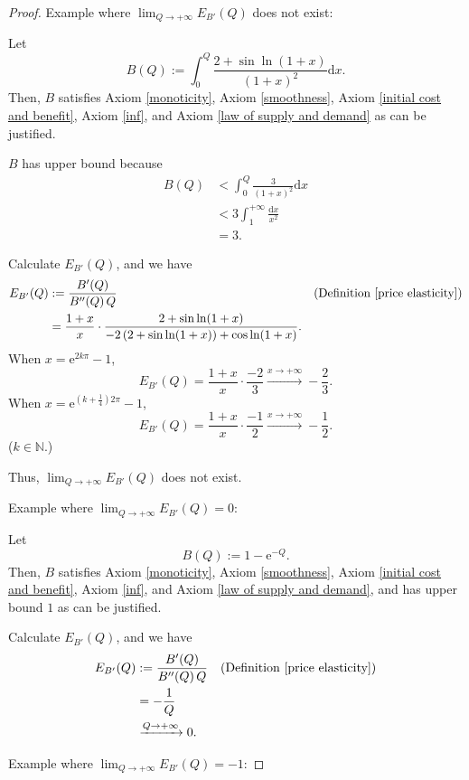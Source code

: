 \documentclass{article}
\begin{document}
\begin{proof}
Example where $\lim_{Q\to+\infty}E_{B'}\!\left(Q\right)$ does not exist:

Let
$$B\!\left(Q\right):=\int_0^Q\frac{2+\sin\ln\!\left(1+x\right)}{\left(1+x\right)^2}\mathrm dx.$$
Then, $B$ satisfies Axiom \ref{monoticity}, Axiom \ref{smoothness}, Axiom \ref{initial cost and benefit}, Axiom \ref{inf}, and Axiom \ref{law of supply and demand} as can be justified.

$B$ has upper bound because
\begin{align*}
B\!\left(Q\right)&<\int_0^Q\frac3{\left(1+x\right)^2}\mathrm dx\\
&<3\int_1^{+\infty}\frac{\mathrm dx}{x^2}\\
&=3.
\end{align*}

Calculate $E_{B'}\!\left(Q\right)$, and we have
\begin{align*}
E_{B'}\!\left(Q\right)&:=\frac{B'\!\left(Q\right)}{B''\!\left(Q\right)Q}&&\text{(Definition \ref{price elasticity})}\\
&=\frac{1+x}x\cdot\frac{2+\sin\ln\!\left(1+x\right)}{-2\left(2+\sin\ln\!\left(1+x\right)\right)+\cos\ln\!\left(1+x\right)}.
\end{align*}
When $x=\mathrm e^{2k\pi}-1$,
$$E_{B'}\!\left(Q\right)=\frac{1+x}x\cdot\frac{-2}3\xrightarrow{x\to+\infty}-\frac23.$$
When $x=\mathrm e^{\left(k+\frac14\right)2\pi}-1$,
$$E_{B'}\!\left(Q\right)=\frac{1+x}x\cdot\frac{-1}2\xrightarrow{x\to+\infty}-\frac12.$$
($k\in\mathbb N$.)

Thus, $\lim_{Q\to+\infty}E_{B'}\!\left(Q\right)$ does not exist.

Example where $\lim_{Q\to+\infty}E_{B'}\!\left(Q\right)=0$:

Let
$$B\!\left(Q\right):=1-\mathrm e^{-Q}.$$
Then, $B$ satisfies Axiom \ref{monoticity}, Axiom \ref{smoothness}, Axiom \ref{initial cost and benefit}, Axiom \ref{inf}, and Axiom \ref{law of supply and demand}, and has upper bound $1$ as can be justified.

Calculate $E_{B'}\!\left(Q\right)$, and we have
\begin{align*}
E_{B'}\!\left(Q\right)&:=\frac{B'\!\left(Q\right)}{B''\!\left(Q\right)Q}&&\text{(Definition \ref{price elasticity})}\\
&=-\frac1Q\\
&\xrightarrow{Q\to+\infty}0.
\end{align*}

Example where $\lim_{Q\to+\infty}E_{B'}\!\left(Q\right)=-1$:


\end{proof}
\end{document}
